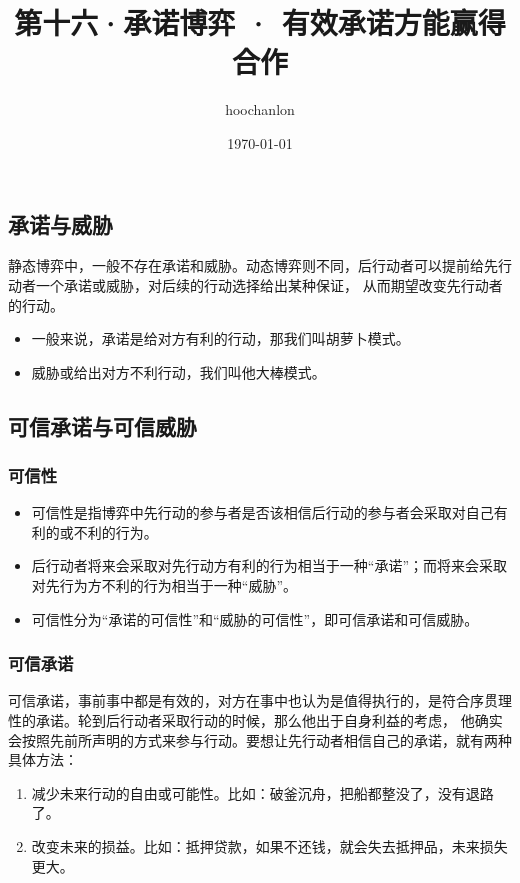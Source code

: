 \documentclass[12pt, a4paper]{article}
\title{第十六·承诺博弈 · 有效承诺方能赢得合作}
\author{hoochanlon}
\date{\today}
\begin{document}
	\begin{CJK*}{UTF8}{gbsn}
		\maketitle
        \clearpage
        \section{承诺与威胁}
        静态博弈中，一般不存在承诺和威胁。动态博弈则不同，后行动者可以提前给先行动者一个承诺或威胁，对后续的行动选择给出某种保证，
        从而期望改变先行动者的行动。
        \begin{itemize}
            \item 一般来说，承诺是给对方有利的行动，那我们叫胡萝卜模式。
            \item 威胁或给出对方不利行动，我们叫他大棒模式。
        \end{itemize}
        \subsection{可信承诺与可信威胁}
        \subsubsection{可信性}
        \begin{itemize}
            \item 可信性是指博弈中先行动的参与者是否该相信后行动的参与者会采取对自己有利的或不利的行为。
            \item 后行动者将来会采取对先行动方有利的行为相当于一种“承诺”；而将来会采取对先行为方不利的行为相当于一种“威胁”。
            \item 可信性分为“承诺的可信性”和“威胁的可信性”，即可信承诺和可信威胁。
        \end{itemize}
        \subsubsection{可信承诺}
        可信承诺，事前事中都是有效的，对方在事中也认为是值得执行的，是符合序贯理性的承诺。轮到后行动者采取行动的时候，那么他出于自身利益的考虑，
        他确实会按照先前所声明的方式来参与行动。要想让先行动者相信自己的承诺，就有两种具体方法：
        \begin{enumerate}
            \item 减少未来行动的自由或可能性。比如：破釜沉舟，把船都整没了，没有退路了。
            \item 改变未来的损益。比如：抵押贷款，如果不还钱，就会失去抵押品，未来损失更大。
        \end{enumerate}
        \clearpage

\end{CJK*}
\end{document}

